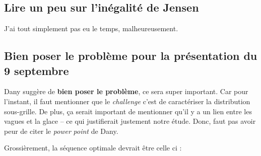 \documentclass[10pt]{article}
\numberwithin{equation}{section}
\begin{document}
\subsection{Lire un peu sur l'inégalité de Jensen}
\label{sec:orge4ff1c5}
J'ai tout simplement pas eu le temps, malheureusement.
\subsection{Bien poser le problème pour la présentation du 9 septembre}
\label{sec:org9084f81}
Dany suggère de \textbf{bien poser le problème}, ce sera super important.
Car pour l'instant, il faut mentionner que le \emph{challenge} c'est de caractériser la distribution sous-grille.
De plus, ça serait important de mentionner qu'il y a un lien entre les vagues et la glace -- ce qui justifierait justement notre étude.
Donc, faut pas avoir peur de citer le \emph{power} \emph{point} de Dany.\bigskip


Grossièrement, la séquence optimale devrait être celle ci : 
\end{document}
